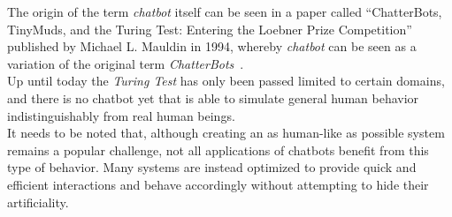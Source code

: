 The origin of the term \emph{chatbot} itself can be seen in a paper called ``ChatterBots, TinyMuds, and the Turing Test: Entering the Loebner Prize Competition'' published by Michael L. Mauldin in 1994, whereby \emph{chatbot} can be seen as a variation of the original term \emph{ChatterBots}~\cite{aiconf}.
\\

Up until today the \emph{Turing Test} has only been passed limited to certain domains, and there is no chatbot yet that is able to simulate general human behavior indistinguishably from real human beings.
\\
It needs to be noted that, although creating an as human-like as possible system remains a popular challenge, not all applications of chatbots benefit from this type of behavior.
Many systems are instead optimized to provide quick and efficient interactions and behave accordingly without attempting to hide their artificiality.
